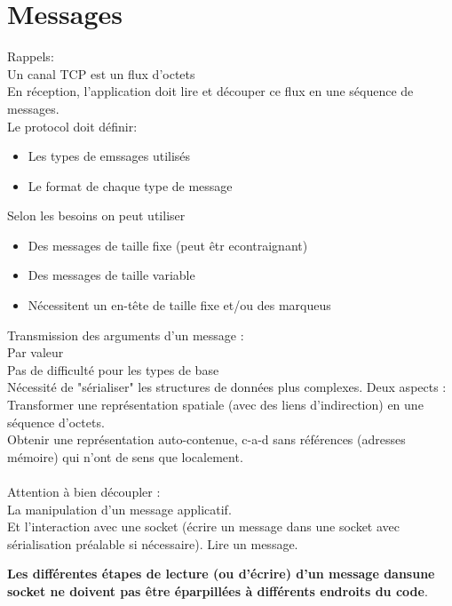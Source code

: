 \documentclass{article}
\begin{document}
\section{Messages}
Rappels:\\
Un canal TCP est un flux d'octets \\
En réception, l'application doit lire et découper ce flux en une séquence de messages.\\
Le protocol doit définir:\\
\begin{itemize}
\item Les types de emssages utilisés
\item Le format de chaque type de message
\end{itemize}

Selon les besoins on peut utiliser
\begin{itemize}
\item Des messages de taille fixe (peut êtr econtraignant)
\item Des messages de taille variable
\item Nécessitent un en-tête de taille fixe et/ou des marqueus
\end{itemize}

Transmission des arguments d'un message :\\
Par valeur\\
Pas de difficulté pour les types de base\\
Nécessité de "sérialiser" les structures de données plus complexes. Deux aspects :
Transformer une représentation spatiale (avec des liens d'indirection) en une séquence d'octets.\\
Obtenir une représentation auto-contenue, c-a-d sans références (adresses mémoire) qui n'ont de sens que localement.\\\\
Attention à bien découpler :\\
La manipulation d'un message applicatif.\\
Et l'interaction avec une socket (écrire un message dans une socket avec sérialisation préalable si nécessaire). Lire un message.

\textbf{Les différentes étapes de lecture (ou d'écrire) d'un message dansune socket ne doivent pas être éparpillées à différents endroits du code}.
\end{document}
